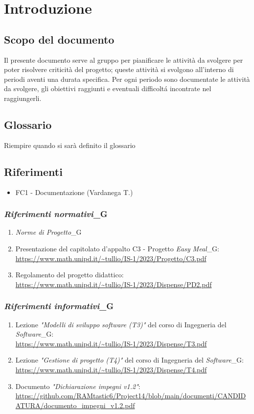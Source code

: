\section{Introduzione}
\subsection{Scopo del documento}
Il presente documento serve al gruppo per pianificare le attività da svolgere per poter risolvere criticità del progetto; queste attività si svolgono all'interno di periodi aventi una durata specifica.
Per ogni periodo sono documentate le attività da svolgere, gli obiettivi raggiunti e eventuali difficoltá incontrate nel raggiungerli.
\subsection{Glossario}
Riempire quando si sarà definito il glossario 
\subsection{Riferimenti}
\begin{itemize}
    \item FC1 - Documentazione (Vardanega T.)
\end{itemize}

\subsubsection{\textit{Riferimenti normativi}_G}
\begin{enumerate}
    \item \textit{Norme di Progetto}_G
    \item Presentazione del capitolato d'appalto C3 - Progetto \textit{Easy Meal}_G: \\ \url{https://www.math.unipd.it/~tullio/IS-1/2023/Progetto/C3.pdf}
    \item Regolamento del progetto didattico: \\ 
    \url{https://www.math.unipd.it/~tullio/IS-1/2023/Dispense/PD2.pdf}
\end{enumerate}
\subsubsection{\textit{Riferimenti informativi}_G}
\label{sec:rif_inf}
\begin{enumerate}
    \item Lezione \emph{"Modelli di sviluppo software (T3)"} del corso di Ingegneria del \textit{Software}_G: \\
    \url{https://www.math.unipd.it/~tullio/IS-1/2023/Dispense/T3.pdf}
    \item Lezione \emph{"Gestione di progetto (T4)"} del corso di Ingegneria del \textit{Software}_G: \\
    \url{https://www.math.unipd.it/~tullio/IS-1/2023/Dispense/T4.pdf}
    \item Documento \emph{"Dichiarazione impegni v1.2"}: \\
    \url{https://github.com/RAMtastic6/Project14/blob/main/documenti/CANDIDATURA/documento_impegni_v1.2.pdf}
    
\end{enumerate}